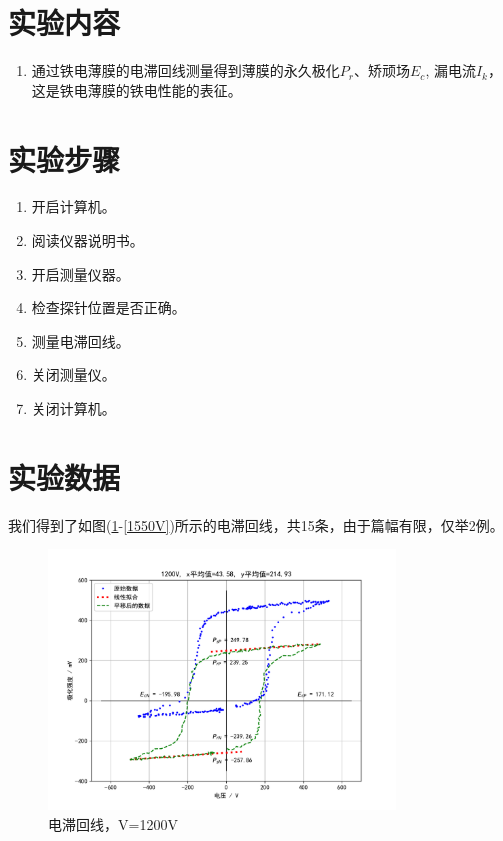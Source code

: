\documentclass[a4paper]{article}
\begin{document}
\section{实验内容}
\begin{enumerate}
    \item 通过铁电薄膜的电滞回线测量得到薄膜的永久极化$P_r$、矫顽场$E_c$, 漏电流$I_k$，这是铁电薄膜的铁电性能的表征。
\end{enumerate}

\section{实验步骤}
\begin{enumerate}
    \item 开启计算机。
    \item 阅读仪器说明书。
    \item 开启测量仪器。
    \item 检查探针位置是否正确。
    \item 测量电滞回线。
    \item 关闭测量仪。
    \item 关闭计算机。
\end{enumerate}

\newpage

\section{实验数据}
我们得到了如图(\ref{1200V}-\ref{1550V})所示的电滞回线，共15条，由于篇幅有限，仅举2例。
\begin{figure}[!h]
    \centering
    \includegraphics[width=0.82\textwidth]{fig/1200V.pdf}
    \caption{电滞回线，V=1200V}\label{1200V}
\end{figure}
\end{document}
